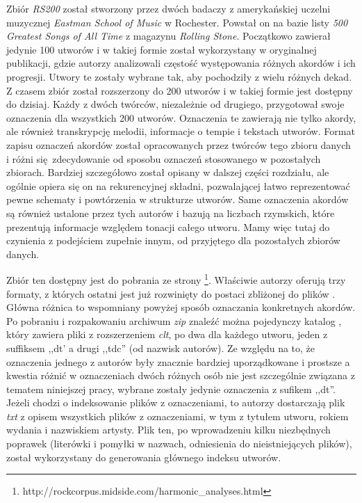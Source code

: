 Zbiór \emph{RS200} \cite{de_clercq_corpus_2011} został stworzony przez dwóch badaczy z amerykańskiej
uczelni muzycznej \emph{Eastman School of Music} w Rochester. Powstał on na bazie listy \emph{500
Greatest Songs of All Time} z magazynu \emph{Rolling Stone}. Początkowo zawierał jedynie 100 utworów i w
takiej formie został wykorzystany w oryginalnej publikacji, gdzie autorzy analizowali częstość
występowania różnych akordów i ich progresji. Utwory te zostały wybrane tak, aby pochodziły z wielu
różnych dekad. Z czasem zbiór został rozszerzony do 200 utworów i w takiej formie jest dostępny do
dzisiaj. Każdy z dwóch twórców, niezależnie od drugiego, przygotował swoje oznaczenia dla wszystkich
200 utworów. Oznaczenia te zawierają nie tylko akordy, ale również transkrypcję melodii, informacje
o tempie i tekstach utworów. Format zapisu oznaczeń akordów został opracowanych przez twórców tego
zbioru danych i różni się zdecydowanie od sposobu oznaczeń stosowanego w pozostałych zbiorach.
Bardziej szczegółowo został opisany w dalszej części rozdziału, ale ogólnie opiera się on na
rekurencyjnej składni, pozwalającej łatwo reprezentować pewne schematy i powtórzenia w strukturze
utworów. Same oznaczenia akordów są również ustalone przez tych autorów i bazują na liczbach
rzymskich, które prezentują informacje względem tonacji całego utworu. Mamy więc tutaj do
czynienia z podejściem zupełnie innym, od przyjętego dla pozostałych zbiorów danych.

Zbiór ten dostępny jest do pobrania ze strony
\footnote{http://rockcorpus.midside.com/harmonic\_analyses.html}. Właściwie autorzy oferują trzy
formaty, z których ostatni jest już rozwinięty do postaci zbliżonej do plików . Główna
różnica to wspomniany powyżej sposób oznaczania konkretnych akordów. Po pobraniu i rozpakowaniu archiwum
\emph{zip} znaleźć można pojedynczy katalog , który zawiera pliki z
rozszerzeniem \emph{clt}, po dwa dla każdego utworu, jeden z suffiksem ,,dt' a drugi ,,tdc'' (od
nazwisk autorów). Ze względu na to, że oznaczenia jednego z autorów były znacznie bardziej
uporządkowane i prostsze a kwestia różnić w oznaczeniach dwóch różnych osób nie jest szczególnie
związana z tematem niniejszej pracy, wybrane zostały jedynie oznaczenia z sufikem ,,dt''. Jeżeli
chodzi o indeksowanie plików z oznaczeniami, to autorzy dostarczają plik \emph{txt} z opisem
wszystkich plików z oznaczeniami, w tym z tytułem utworu, rokiem wydania i nazwiskiem artysty. Plik
ten, po wprowadzeniu kilku niezbędnych poprawek (literówki i pomyłki w nazwach, odniesienia do
nieistniejących plików), został wykorzystany do generowania głównego indeksu utworów.


